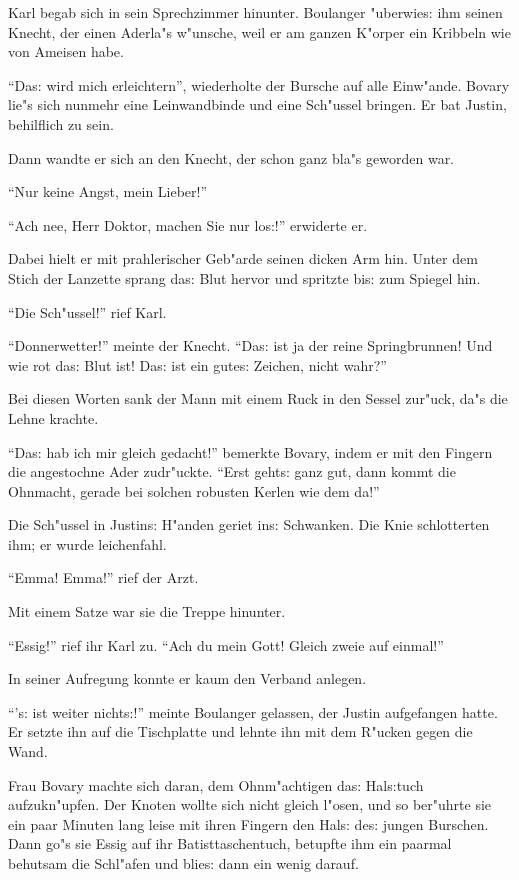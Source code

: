 \documentclass[oneside,12pt]{book}
\newcommand{\s}{s:}%
\begin{document}
Karl begab sich in sein Sprechzimmer hinunter. Boulanger
"uberwie{\s} ihm seinen Knecht, der einen Aderla"s w"unsche, weil
er am ganzen K"orper ein Kribbeln wie von Ameisen habe.

"`Da{\s} wird mich erleichtern"', wiederholte der Bursche auf alle
Einw"ande. Bovary lie"s sich nunmehr eine Leinwandbinde und eine
Sch"ussel bringen. Er bat Justin, behilflich zu sein.

Dann wandte er sich an den Knecht, der schon ganz bla"s geworden
war.

"`Nur keine Angst, mein Lieber!"'

"`Ach nee, Herr Doktor, machen Sie nur lo{\s}!"' erwiderte er.

Dabei hielt er mit prahlerischer Geb"arde seinen dicken Arm hin.
Unter dem Stich der Lanzette sprang da{\s} Blut hervor und
spritzte bi{\s} zum Spiegel hin.

"`Die Sch"ussel!"' rief Karl.

"`Donnerwetter!"' meinte der Knecht. "`Da{\s} ist ja der reine
Springbrunnen! Und wie rot da{\s} Blut ist! Da{\s} ist ein
gute{\s} Zeichen, nicht wahr?"'

Bei diesen Worten sank der Mann mit einem Ruck in den Sessel
zur"uck, da"s die Lehne krachte.

"`Da{\s} hab ich mir gleich gedacht!"' bemerkte Bovary, indem er
mit den Fingern die angestochne Ader zudr"uckte. "`Erst geht{\s}
ganz gut, dann kommt die Ohnmacht, gerade bei solchen robusten
Kerlen wie dem da!"'

Die Sch"ussel in Justin{\s} H"anden geriet in{\s} Schwanken. Die
Knie schlotterten ihm; er wurde leichenfahl.

"`Emma! Emma!"' rief der Arzt.

Mit einem Satze war sie die Treppe hinunter.

"`Essig!"' rief ihr Karl zu. "`Ach du mein Gott! Gleich zweie auf
einmal!"'

In seiner Aufregung konnte er kaum den Verband anlegen.

"`'{\s} ist weiter nicht{\s}!"' meinte Boulanger gelassen, der
Justin aufgefangen hatte. Er setzte ihn auf die Tischplatte und
lehnte ihn mit dem R"ucken gegen die Wand.

Frau Bovary machte sich daran, dem Ohnm"achtigen da{\s}
Hal{\s}tuch aufzukn"upfen. Der Knoten wollte sich nicht gleich
l"osen, und so ber"uhrte sie ein paar Minuten lang leise mit ihren
Fingern den Hal{\s} de{\s} jungen Burschen. Dann go"s sie Essig
auf ihr Batisttaschentuch, betupfte ihm ein paarmal behutsam die
Schl"afen und blie{\s} dann ein wenig darauf.
\end{document}
